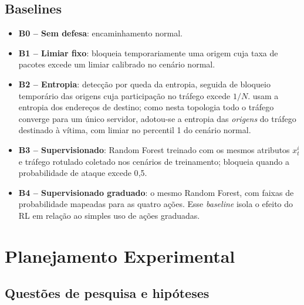\documentclass[12pt]{article}
\begin{document}
\subsection{Baselines}

\begin{itemize}
  \item \textbf{B0 -- Sem defesa}: encaminhamento normal.
  \item \textbf{B1 -- Limiar fixo}: bloqueia temporariamente uma origem cuja
        taxa de pacotes excede um limiar calibrado no cenário normal.
  \item \textbf{B2 -- Entropia}: detecção por queda da entropia, seguida de
        bloqueio temporário das origens cuja participação no tráfego excede
        $1/N$. \cite{mousavi2015entropy} usam a entropia dos endereços de
        destino; como nesta topologia todo o tráfego converge para um único
        servidor, adotou-se a entropia das \emph{origens} do tráfego destinado
        à vítima, com limiar no percentil 1 do cenário normal.
  \item \textbf{B3 -- Supervisionado}: Random Forest \cite{breiman2001rf}
        treinado com os mesmos atributos $x_t^i$ e tráfego rotulado coletado
        nos cenários de treinamento; bloqueia quando a probabilidade de ataque
        excede 0{,}5.
  \item \textbf{B4 -- Supervisionado graduado}: o mesmo Random Forest, com
        faixas de probabilidade mapeadas para as quatro ações. Esse
        \textit{baseline} isola o efeito do RL em relação ao simples uso de
        ações graduadas.
\end{itemize}

\section{Planejamento Experimental}\label{sec:planejamento}

\subsection{Questões de pesquisa e hipóteses}
\end{document}
